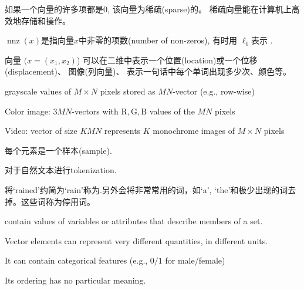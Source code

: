 \begin{definition}[稀疏向量]
    如果一个向量的许多项都是0, 该向量为稀疏(sparse)的。 稀疏向量能在计算机上高效地存储和操作。 

$\operatorname{nnz}(x)$是指向量$x$中非零的项数(number of non-zeros), 有时用 $\ell_0$表示 . 

\end{definition}

向量 $( x=\left(x_{1}, x_{2}\right) $) 可以在二维中表示一个位置(location)或一个位移(displacement)、 图像(列向量)、 表示一句话中每个单词出现多少次、颜色等。 

\begin{example}
    grayscale values of $ M \times N $ pixels stored as $ M N $-vector (e.g., row-wise)

    Color image: $ 3 M N $-vectors with $ \mathrm{R}, \mathrm{G}, \mathrm{B} $ values of the $ M N $ pixels

    Video: vector of size $ K M N $ represents $ K $ monochrome images of $ M \times N $ pixels
\end{example}

\begin{example}[时间序列]
    每个元素是一个样本(sample).
\end{example}

\begin{example}[自然文本进行tokenization]
    对于自然文本进行tokenization.

    将`rained'约简为`rain'称为.另外会将非常常用的词，如`a', `the'和极少出现的词去掉。这些词称为停用词。
\end{example}

\begin{example}
    contain values of variables or attributes that describe members of a set.
\end{example}

\begin{remark}
    Vector elements can represent very different quantities, in different units.
\end{remark}

\begin{remark}
    It can contain categorical features (e.g., $0/1$ for male/female)
\end{remark}

\begin{remark}
    Its ordering has no particular meaning.
\end{remark}

